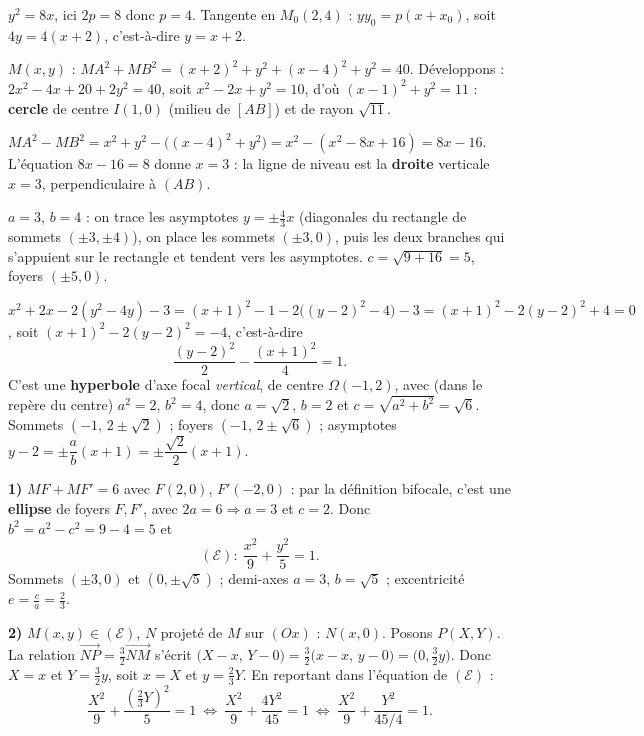 $y^{2}=8x$, ici $2p=8$ donc $p=4$. Tangente en $M_0(2,4)$ : $yy_0=p(x+x_0)$, soit
$4y=4(x+2)$, c'est-à-dire $y=x+2$.

$M(x,y)$ : $MA^{2}+MB^{2}=(x+2)^{2}+y^{2}+(x-4)^{2}+y^{2}=40$. Développons :
$2x^{2}-4x+20+2y^{2}=40$, soit $x^{2}-2x+y^{2}=10$, d'où $(x-1)^{2}+y^{2}=11$ :
\textbf{cercle} de centre $I(1,0)$ (milieu de $[AB]$) et de rayon $\sqrt{11}$.

$MA^{2}-MB^{2}=x^{2}+y^{2}-\big((x-4)^{2}+y^{2}\big)=x^{2}-(x^{2}-8x+16)=8x-16$.
L'équation $8x-16=8$ donne $x=3$ : la ligne de niveau est la \textbf{droite} verticale
$x=3$, perpendiculaire à $(AB)$.

$a=3$, $b=4$ : on trace les asymptotes $y=\pm\tfrac43 x$ (diagonales du rectangle de
sommets $(\pm3,\pm4)$), on place les sommets $(\pm3,0)$, puis les deux branches qui
s'appuient sur le rectangle et tendent vers les asymptotes. $c=\sqrt{9+16}=5$, foyers
$(\pm5,0)$.

$x^{2}+2x-2(y^{2}-4y)-3=(x+1)^{2}-1-2\big((y-2)^{2}-4\big)-3
=(x+1)^{2}-2(y-2)^{2}+4=0$, soit $(x+1)^{2}-2(y-2)^{2}=-4$, c'est-à-dire
\[
\frac{(y-2)^{2}}{2}-\frac{(x+1)^{2}}{4}=1.
\]
C'est une \textbf{hyperbole} d'axe focal \emph{vertical}, de centre $\Omega(-1,2)$, avec
(dans le repère du centre) $a^{2}=2$, $b^{2}=4$, donc $a=\sqrt2$, $b=2$ et
$c=\sqrt{a^{2}+b^{2}}=\sqrt6$. Sommets $(-1,\,2\pm\sqrt2)$ ; foyers $(-1,\,2\pm\sqrt6)$ ;
asymptotes $y-2=\pm\dfrac{a}{b}(x+1)=\pm\dfrac{\sqrt2}{2}(x+1)$.

\textbf{1)} $MF+MF'=6$ avec $F(2,0)$, $F'(-2,0)$ : par la définition bifocale, c'est une
\textbf{ellipse} de foyers $F,F'$, avec $2a=6\Rightarrow a=3$ et $c=2$. Donc
$b^{2}=a^{2}-c^{2}=9-4=5$ et
\[
(\mathcal E):\ \frac{x^{2}}{9}+\frac{y^{2}}{5}=1.
\]
Sommets $(\pm3,0)$ et $(0,\pm\sqrt5)$ ; demi-axes $a=3$, $b=\sqrt5$ ;
excentricité $e=\tfrac ca=\tfrac23$.

\noindent\textbf{2)} $M(x,y)\in(\mathcal E)$, $N$ projeté de $M$ sur $(Ox)$ : $N(x,0)$.
Posons $P(X,Y)$. La relation $\overrightarrow{NP}=\tfrac32\overrightarrow{NM}$ s'écrit
$\big(X-x,\,Y-0\big)=\tfrac32\big(x-x,\,y-0\big)=\big(0,\tfrac32 y\big)$.
Donc $X=x$ et $Y=\tfrac32 y$, soit $x=X$ et $y=\tfrac23 Y$.
En reportant dans l'équation de $(\mathcal E)$ :
\[
\frac{X^{2}}{9}+\frac{\left(\frac23 Y\right)^{2}}{5}=1
\ \Longleftrightarrow\
\frac{X^{2}}{9}+\frac{4Y^{2}}{45}=1
\ \Longleftrightarrow\
\frac{X^{2}}{9}+\frac{Y^{2}}{45/4}=1.
\]

